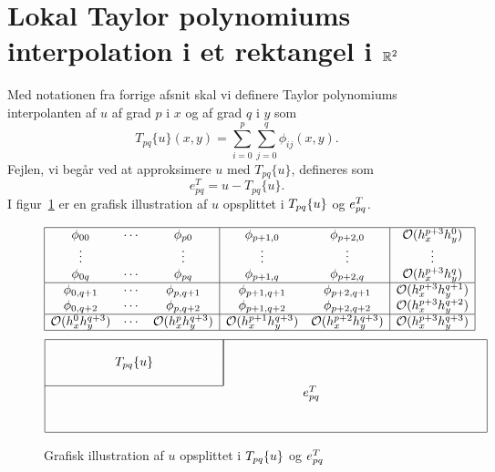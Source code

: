 \section{Lokal Taylor po\-ly\-no\-mi\-ums in\-ter\-po\-la\-ti\-on i et rek\-tan\-gel i $\mathbb{R}^2$}
Med notationen fra forrige afsnit skal vi definere Taylor polynomiums
interpolanten af $u$ af grad $p$ i $x$ og af grad $q$ i $y$ som
\begin{equation}
  T_{pq}\{u\}(x,y) = \sum_{i=0}^{p} \sum_{j=0}^{q} \phi_{ij}(x,y).
\end{equation}
Fejlen, vi begår ved at approksimere $u$ med $T_{pq}\{u\}$, defineres som
\begin{equation}
  e_{pq}^T = u - T_{pq}\{u\}.
\end{equation}
I figur~\ref{grafisk} er en grafisk illustration af $u$ opsplittet i
$T_{pq}\{u\}$ og $e_{pq}^T$.
\begin{figure}[htb]
\begin{displaymath}
\begin{array}{|ccc|cc|c|}
 \hline \phi_{00} & \cdots & \phi_{p0} & \phi_{p+1,0}
          & \phi_{p+2,0} & {\mathcal O} (h_x^{p+3}h_y^0) \\
        \vdots & & \vdots & \vdots & \vdots & \vdots \\
        \phi_{0q} & \cdots & \phi_{pq} & \phi_{p+1,q}
          & \phi_{p+2,q} & {\mathcal O} (h_x^{p+3}h_y^q) \\
 \hline \phi_{0,q+1} & \cdots & \phi_{p,q+1} & \phi_{p+1,q+1}
          & \phi_{p+2,q+1} & {\mathcal O} (h_x^{p+3}h_y^{q+1}) \\
        \phi_{0,q+2} & \cdots & \phi_{p,q+2} & \phi_{p+1,q+2}
          & \phi_{p+2,q+2} & {\mathcal O} (h_x^{p+3}h_y^{q+2}) \\
 \hline {\mathcal O} (h_x^0 h_y^{q+3}) & \cdots & {\mathcal O} (h_x^p h_y^{q+3})
          & {\mathcal O} (h_x^{p+1} h_y^{q+3}) & {\mathcal O} (h_x^{p+2} h_y^{q+3})
            & {\mathcal O} (h_x^{p+3} h_y^{q+3}) \\
 \hline
\end{array}
\end{displaymath}
\begin{displaymath}
\begin{array}{|cccccc|}
 \hline
 \multicolumn{3}{|c|}{} & \multicolumn{3}{|c|}{}  \\
 \multicolumn{3}{|c|}{T_{pq}\{u\}} & \multicolumn{3}{|c|}{}  \\
 \multicolumn{3}{|c|}{} & \multicolumn{3}{|c|}{}  \\ \cline{1-3}
 & & & \multicolumn{2}{c}{e_{pq}^T}   & \\
 & & & & & \\
        \phantom{\O (h_x^0 h_y^{q+3})} &
        \phantom{\cdots} &
        \phantom{\O (h_x^p h_y^{q+3})} &
        \phantom{\O (h_x^{p+1} h_y^{q+3})} &
        \phantom{\O (h_x^{p+2} h_y^{q+3})} &
        \phantom{\O (h_x^{p+3} h_y^{q+3})} \\
 \hline
\end{array}
\end{displaymath}
\caption{Grafisk illustration af $u$ opsplittet i $T_{pq}\{u\}$ og $e_{pq}^T$\label{grafisk}}
\end{figure}
